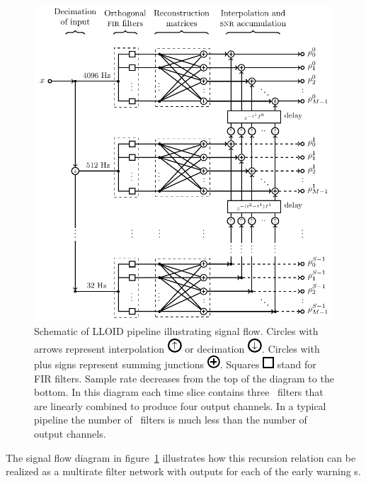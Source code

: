 \begin{figure}[htbp]
	\includegraphics{figures/lloid-diagram.pdf}
	\caption{\label{fig:pipeline} Schematic of LLOID pipeline illustrating
signal flow.  Circles with arrows represent interpolation
\protect\includegraphics{figures/upsample-symbol.pdf} or decimation
\protect\includegraphics{figures/downsample-symbol.pdf}.  Circles with plus
signs represent summing junctions
\protect\includegraphics{figures/adder-symbol.pdf}.  Squares
\protect\includegraphics{figures/fir-symbol.pdf} stand for FIR filters.  Sample
rate decreases from the top of the diagram to the bottom.  In this diagram each
time slice contains three \fir\ filters that are linearly combined to produce
four output channels.  In a typical pipeline the number of \fir\ filters is
much less than the number of output channels.}
\end{figure}
%
%
The signal flow diagram in figure~\ref{fig:pipeline} illustrates how this
recursion relation can be realized as a multirate filter network with outputs for
each of the early warning \SNR{}s.

